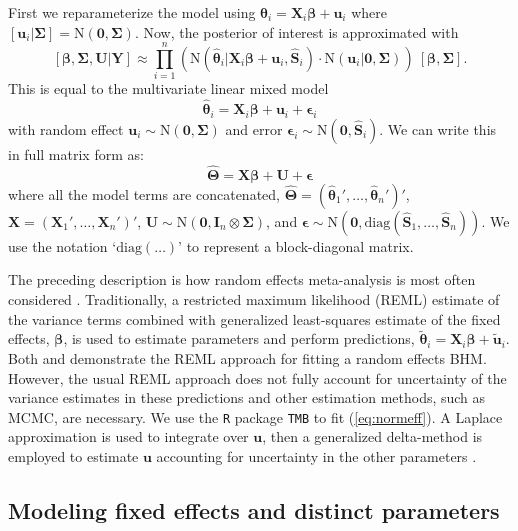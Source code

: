 \documentclass[12pt]{article}
\newcommand{\bt}{\boldsymbol{\theta}}
\newcommand{\bb}{\boldsymbol{\beta}}
\newcommand{\bT}{\boldsymbol{\Theta}}
\newcommand{\bSig}{\boldsymbol{\Sigma}}
\newcommand{\bS}{\mathbf{S}}
\newcommand{\bX}{\mathbf{X}}
\newcommand{\bU}{\mathbf{U}}
\newcommand{\bu}{\mathbf{u}}
\newcommand{\tN}{\text{N}}
\newcommand{\bY}{\mathbf{Y}}
\newcommand{\bI}{\mathbf{I}}
\newcommand{\bz}{\mathbf{0}}
\begin{document}
First we reparameterize the model using $\bt_i = \bX_i\bb + \bu_i$ where $[\bu_i|\bSig] = \tN(\mathbf{0},\bSig)$. Now, the posterior of interest is approximated with
\begin{equation}
\label{eq:normeff}
[\bb,\bSig,\bU|\bY] \approx  \prod_{i=1}^n\left(\tN(\hat{\bt}_i|\bX_i\bb+\bu_i, \hat{\bS}_i)\cdot \tN(\bu_i|\mathbf{0},\bSig)\right)\ [\bb, \bSig].
\end{equation}
This is equal to the multivariate linear mixed model
\[
\hat{\bt}_i = \bX_i\bb + \bu_i + \boldsymbol{\epsilon}_i
\]
with random effect $\bu_i \sim \text{N}(\mathbf{0},\bSig)$ and error $\boldsymbol{\epsilon}_i \sim \text{N}(\mathbf{0},\hat{\bS}_i)$. We can write this in full matrix form as:
\begin{equation}\label{eq:full.mat.form}
\hat{\bT} = \bX\bb + \bU + \boldsymbol{\epsilon}
\end{equation}
where all the model terms are concatenated, $\hat{\bT} = (\hat{\bt}_1',\dots,\hat{\bt}_n')'$, $\bX = (\bX_1',\dots,\bX_n')'$, $\bU \sim \tN(\bz, \bI_n\otimes\bSig)$, and $\boldsymbol{\epsilon} \sim \tN(\mathbf{0}, \text{diag}(\hat{\bS}_1,\dots,\hat{\bS}_n))$. We use the notation `$\text{diag}(\dots)$' to represent a block-diagonal matrix. 

The preceding description is how random effects meta-analysis is most often considered \citep{higgins2009re}. Traditionally, a restricted maximum likelihood (REML) estimate of the variance terms combined with generalized least-squares estimate of the fixed effects, $\bb$, is used to estimate parameters and perform predictions, $\tilde{\bt}_i = \bX_i\bb + \tilde{\bu}_i$. Both \citet{burnham2002evaluation} and \cite{zeppelin2019migratory} demonstrate the REML approach for fitting a random effects BHM. However, the usual REML approach does not fully account for uncertainty of the variance estimates in these predictions and other estimation methods, such as MCMC, are necessary. We use the {\tt R} package {\tt TMB} to fit (\ref{eq:normeff}). A Laplace approximation is used to integrate over $\bu$, then a generalized delta-method \citep{Dorfman:1938af, ver2012invented} is employed to estimate $\bu$ accounting for uncertainty in the other parameters \citep{kristensen2016tmb,skaug2006automatic}. 






\subsection{Modeling fixed effects and distinct parameters}
\end{document}
